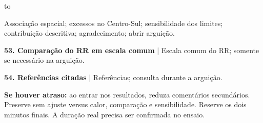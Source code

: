 \documentclass[11pt,a4paper]{article}
\newcommand{\pista}[4]{\noindent\begin{minipage}{\linewidth}
\hbox to \linewidth{\strut\textbf{\textcolor{azul}{#1}}\hfil{\small #2}}\par\vspace{0.08cm}
{\fontsize{10.8}{13.1}\selectfont\raggedright #3\par}
#4\end{minipage}\par\vspace{0.27cm}}
\begin{document}
\pista{52. Considerações finais}{\textbf{\color{azul}35s | fim 37:30}}{Associação espacial; excessos no Centro-Sul; sensibilidade dos limites; contribuição descritiva; agradecimento; abrir arguição.}{}
\vspace{0.15cm}
{\small\textbf{53. Comparação do RR em escala comum} | Escala comum do RR; somente se necessário na arguição.\par}\vspace{0.1cm}
{\small\textbf{54. Referências citadas} | Referências; consulta durante a arguição.\par}\vspace{0.1cm}
\vfill{\small\textbf{Se houver atraso:} ao entrar nos resultados, reduza comentários secundários. Preserve sem ajuste versus calor, comparação e sensibilidade. Reserve os dois minutos finais. A duração real precisa ser confirmada no ensaio.\par}
\end{document}
